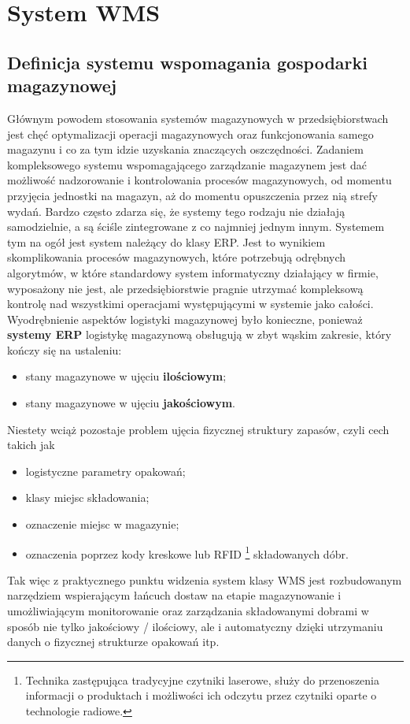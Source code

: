 \chapter{System WMS}
\label{c5:c5}

\section{Definicja systemu wspomagania gospodarki magazynowej}
	Głównym powodem stosowania systemów magazynowych w przedsiębiorstwach jest chęć optymalizacji
	operacji magazynowych oraz funkcjonowania samego magazynu i co za tym idzie uzyskania
	znaczących oszczędności. Zadaniem kompleksowego systemu wspomagającego zarządzanie magazynem jest dać możliwość
	nadzorowanie i kontrolowania procesów magazynowych, od momentu przyjęcia jednostki na magazyn,
	aż do momentu opuszczenia przez nią strefy wydań. Bardzo często zdarza się, że systemy tego rodzaju
	nie działają samodzielnie, a są ściśle zintegrowane z co najmniej jednym innym. Systemem tym na 
	ogół jest system należący do klasy ERP. Jest to wynikiem skomplikowania procesów
	magazynowych, które potrzebują odrębnych algorytmów, w które standardowy system informatyczny 
	działający w firmie, wyposażony nie jest, ale przedsiębiorstwie pragnie utrzymać kompleksową 
	kontrolę nad wszystkimi operacjami występującymi w systemie jako całości.\\
	
	Wyodrębnienie aspektów logistyki magazynowej było konieczne, ponieważ \textbf{systemy ERP}
	logistykę magazynową obsługują w zbyt wąskim zakresie, który kończy się na ustaleniu:
	\begin{itemize}
		\item stany magazynowe w ujęciu \textbf{ilościowym};
		\item stany magazynowe w ujęciu \textbf{jakościowym}.
	\end{itemize}
	Niestety wciąż pozostaje problem ujęcia fizycznej struktury zapasów, czyli cech takich jak
	\begin{itemize}
		\item logistyczne parametry opakowań;
		\item klasy miejsc składowania;
		\item oznaczenie miejsc w magazynie;
		\item oznaczenia poprzez kody kreskowe lub RFID 
			\footnote{Technika zastępująca tradycyjne czytniki laserowe, służy do przenoszenia
			informacji o produktach i możliwości ich odczytu przez czytniki oparte o technologie
			radiowe.} składowanych dóbr.
	\end{itemize}
	Tak więc z praktycznego punktu widzenia system klasy WMS jest rozbudowanym narzędziem
	wspierającym łańcuch dostaw na etapie magazynowanie i umożliwiającym monitorowanie
	oraz zarządzania składowanymi dobrami w sposób nie tylko jakościowy / ilościowy, ale i
	automatyczny dzięki utrzymaniu danych o fizycznej strukturze opakowań itp. 	
	
